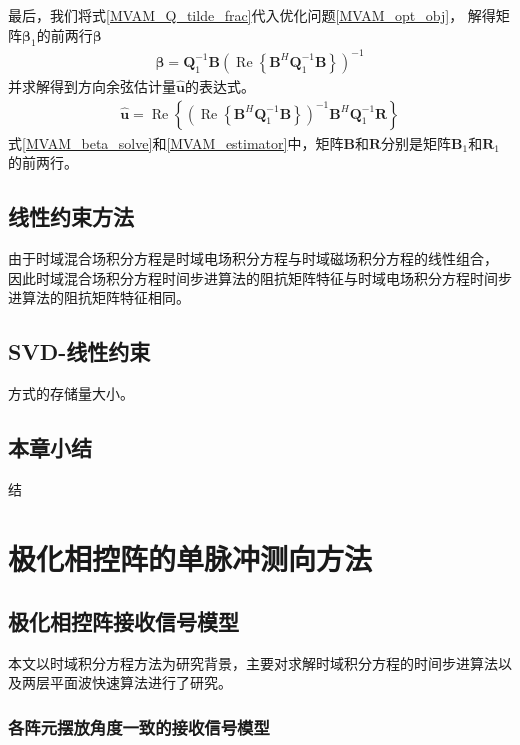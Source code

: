 \documentclass[master]{thesis-uestc}
\begin{document}
最后，我们将式\eqref{MVAM_Q_tilde_frac}代入优化问题\eqref{MVAM_opt_obj}，
解得矩阵$\bm{\beta}_1$的前两行$\bm{\beta}$
\begin{equation}\label{MVAM_beta_solve}
    \begin{aligned}
        \bm{\beta} = \bm{Q}^{-1}_1\bm{B}
        \left(\operatorname{Re}\left\{\bm{B}^H\bm{Q}^{-1}_1\bm{B}\right\}\right)^{-1}
    \end{aligned}
\end{equation}
并求解得到方向余弦估计量$\hat{\bm{u}}$的表达式。
\begin{equation}\label{MVAM_estimator}
    \begin{aligned}
        \hat{\bm{u}} = \operatorname{Re}
        \left\{
            \left(\operatorname{Re}\left\{\bm{B}^H\bm{Q}^{-1}_1\bm{B}\right\}\right)^{-1}
            \bm{B}^H\bm{Q}^{-1}_1\bm{R}
        \right\}
    \end{aligned}
\end{equation}
式\eqref{MVAM_beta_solve}和\eqref{MVAM_estimator}中，矩阵$\bm{B}$和$\bm{R}$分别是矩阵$\bm{B}_1$和$\bm{R}_1$的前两行。

\section{线性约束方法}
由于时域混合场积分方程是时域电场积分方程与时域磁场积分方程的线性组合，
因此时域混合场积分方程时间步进算法的阻抗矩阵特征与时域电场积分方程时间步进算法的阻抗矩阵特征相同。

\section{SVD-线性约束}
方式的存储量大小。

\section{本章小结}
结

\chapter{极化相控阵的单脉冲测向方法}

\section{极化相控阵接收信号模型}
本文以时域积分方程方法为研究背景，主要对求解时域积分方程的时间步进算法以及两层平面波快速算法进行了研究。
\subsection{各阵元摆放角度一致的接收信号模型}
\end{document}
